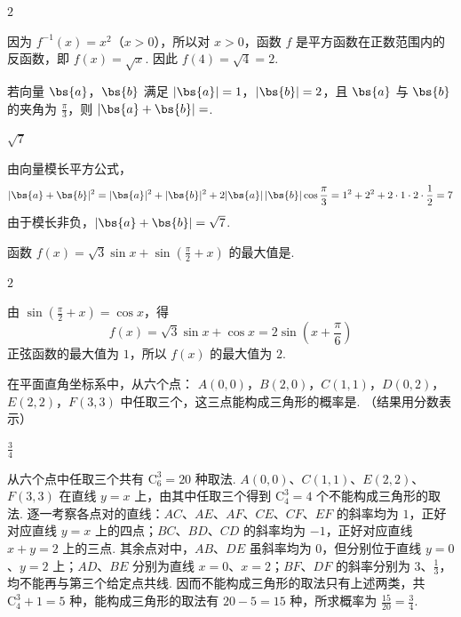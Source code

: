 \begin{answer}
\(2\)
\end{answer}

\begin{solution}
因为 \(f^{-1}(x)=x^2\)（\(x>0\)），所以对 \(x>0\)，函数 \(f\) 是平方函数在正数范围内的反函数，即 \(f(x)=\sqrt{x}\). 因此 \(f(4)=\sqrt4=2\).
\end{solution}

\begin{problem}
若向量 \(\bs{a}\)，\(\bs{b}\) 满足 \(|\bs{a}| = 1\)，\(|\bs{b}| = 2\)，且 \(\bs{a}\) 与 \(\bs{b}\) 的夹角为 \(\frac{\pi}{3}\)，则 \(|\bs{a} + \bs{b}| = \)\fillinblank{}.
\end{problem}

\begin{answer}
\(\sqrt{7}\)
\end{answer}

\begin{solution}
由向量模长平方公式，
\[
|\bs{a}+\bs{b}|^2=|\bs{a}|^2+|\bs{b}|^2+2|\bs{a}|\,|\bs{b}|\cos\frac{\pi}{3}=1^2+2^2+2\cdot1\cdot2\cdot\frac12=7
\]
由于模长非负，\(|\bs{a}+\bs{b}|=\sqrt7\).
\end{solution}

\begin{problem}
函数 \( f(x) = \sqrt{3}\sin x + \sin \left(\frac{\pi}{2} + x\right) \) 的最大值是\fillinblank{}.
\end{problem}

\begin{answer}
\(2\)
\end{answer}

\begin{solution}
由 \(\sin\left(\frac{\pi}{2}+x\right)=\cos x\)，得
\[
f(x)=\sqrt3\sin x+\cos x=2\sin\left(x+\frac{\pi}{6}\right)
\]
正弦函数的最大值为 \(1\)，所以 \(f(x)\) 的最大值为 \(2\).
\end{solution}

\begin{problem}
在平面直角坐标系中，从六个点： \(A(0,0)\)，\(B(2,0)\)，\(C(1,1)\)，\(D(0,2)\)，\(E(2,2)\)，\(F(3,3)\) 中任取三个，这三点能构成三角形的概率是\fillinblank{}. （结果用分数表示）
\end{problem}

\begin{answer}
\(\frac{3}{4}\)
\end{answer}

\begin{solution}
从六个点中任取三个共有 \(\mathrm C_6^3=20\) 种取法. \(A(0,0)\)、\(C(1,1)\)、\(E(2,2)\)、\(F(3,3)\) 在直线 \(y=x\) 上，由其中任取三个得到 \(\mathrm C_4^3=4\) 个不能构成三角形的取法. 逐一考察各点对的直线：\(AC\)、\(AE\)、\(AF\)、\(CE\)、\(CF\)、\(EF\) 的斜率均为 \(1\)，正好对应直线 \(y=x\) 上的四点；\(BC\)、\(BD\)、\(CD\) 的斜率均为 \(-1\)，正好对应直线 \(x+y=2\) 上的三点. 其余点对中，\(AB\)、\(DE\) 虽斜率均为 \(0\)，但分别位于直线 \(y=0\)、\(y=2\) 上；\(AD\)、\(BE\) 分别为直线 \(x=0\)、\(x=2\)；\(BF\)、\(DF\) 的斜率分别为 \(3\)、\(\frac13\)，均不能再与第三个给定点共线. 因而不能构成三角形的取法只有上述两类，共 \(\mathrm C_4^3+1=5\) 种，能构成三角形的取法有 \(20-5=15\) 种，所求概率为 \(\frac{15}{20}=\frac34\).
\end{solution}

